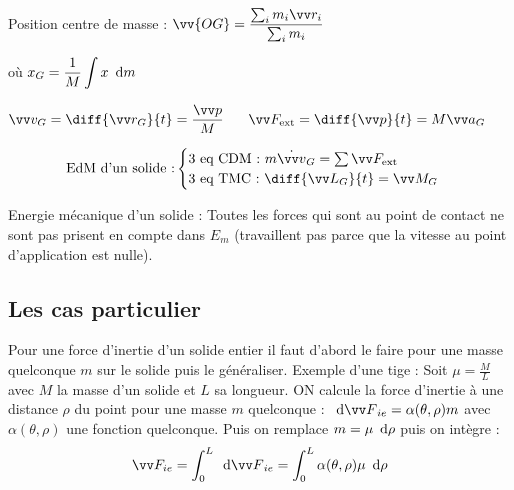 \documentclass[../main.tex]{subfiles}
\begin{document}
Position centre de masse : \(\displaystyle \vv{OG}=\frac{\sum_im_i\pos_i}{\sum_im_i}\)

où \(\displaystyle x_G = \frac{1}{M}\int x\,\,\,\mathrm{d}{m}\) 


\(\displaystyle \vi_G = \diff{\pos_G}{t}=\frac{\qm}{M}\phantom{text}\F_{\exte}=\diff{\qm}{t}=M\ac_G\)

\[\text{EdM d'un solide :}
  \begin{cases}
    \text{3 eq CDM : }m\dot{\vi}_G=\sum\F_{\exte}\\
    \text{3 eq TMC : }\diff{\mc_G}{t}=\mf_G
  \end{cases}
\]

Energie mécanique d'un solide : Toutes les forces qui sont au point de contact ne sont pas prisent en compte dans \(E_m\) (travaillent pas parce que la vitesse au point d'application est nulle).

\subsection{Les cas particulier}
Pour une force d'inertie d'un solide entier il faut d'abord le faire pour une masse quelconque \(m\) sur le solide puis le généraliser. Exemple d'une tige : Soit \(\displaystyle\mu=\frac{M}{L}\) avec \(M\) la masse d'un solide et \(L\) sa longueur. ON calcule la force d'inertie à une distance \(\rho\) du point pour une masse \(m\) quelconque : \(\dee \F_{ie}=\alpha(\theta,\rho)m\) avec \(\alpha(\theta, \rho)\) une fonction quelconque. Puis on remplace \(m=\mu\,\,\,\mathrm{d}{\rho}\) puis on intègre : 
\[
  \F_{ie} = \int_0^L \dee\F_{ie} = \int_0^L\alpha(\theta,\rho)\mu\dee\rho
\]
\end{document}
